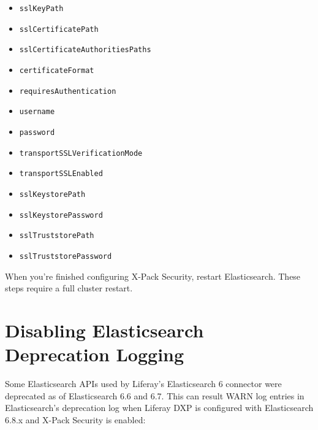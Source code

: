 \begin{itemize}
\tightlist
\item
  \texttt{sslKeyPath}
\item
  \texttt{sslCertificatePath}
\item
  \texttt{sslCertificateAuthoritiesPaths}
\item
  \texttt{certificateFormat}
\item
  \texttt{requiresAuthentication}
\item
  \texttt{username}
\item
  \texttt{password}
\item
  \texttt{transportSSLVerificationMode}
\item
  \texttt{transportSSLEnabled}
\item
  \texttt{sslKeystorePath}
\item
  \texttt{sslKeystorePassword}
\item
  \texttt{sslTruststorePath}
\item
  \texttt{sslTruststorePassword}
\end{itemize}

When you're finished configuring X-Pack Security, restart Elasticsearch.
These steps require a full cluster restart.

\section{Disabling Elasticsearch Deprecation
Logging}\label{disabling-elasticsearch-deprecation-logging}

Some Elasticsearch APIs used by Liferay's Elasticsearch 6 connector were
deprecated as of Elasticsearch 6.6 and 6.7. This can result WARN log
entries in Elasticsearch's deprecation log when Liferay DXP is
configured with Elasticsearch 6.8.x and X-Pack Security is enabled:

